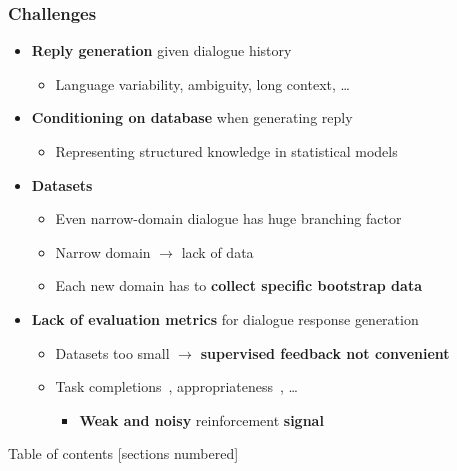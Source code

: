 \documentclass[10pt, compress,british,xcolor={svgnames,dvipsnames,x11names},trans]{beamer}
\begin{document}
\begin{frame}\frametitle{Challenges}
    \begin{itemize}
        \item {\bf Reply generation} given dialogue history
            \begin{itemize}
                \item Language variability, ambiguity, long context, \dots
            \end{itemize}
        \item {\bf Conditioning on database} when generating reply
            \begin{itemize}
                \item Representing structured knowledge in statistical models
            \end{itemize}
        \item {\bf Datasets}
            \begin{itemize}
                \item Even narrow-domain  dialogue has huge branching factor
                \item Narrow domain $\longrightarrow$ lack of data
                \item Each new domain has to {\bf collect specific bootstrap data}
            \end{itemize}
        \item {\bf Lack of evaluation metrics} for dialogue response generation
            \begin{itemize}
                \item Datasets too small $\longrightarrow$ {\bf supervised feedback not convenient}
                \item Task completions~\cite{todo}, appropriateness~\cite{todo}, \dots 
                \begin{itemize}
                    \item {\bf Weak and noisy} reinforcement {\bf signal}
                \end{itemize}
            \end{itemize}
    \end{itemize}
\end{frame}

\begin{frame}{Table of contents}
  [sections numbered]
  \tableofcontents[hideallsubsections]
\end{frame}
\end{document}
